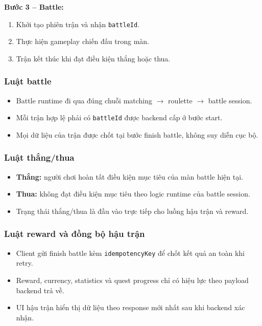 \textbf{Bước 3 -- Battle:}
\begin{enumerate}
    \item Khởi tạo phiên trận và nhận \texttt{battleId}.
    \item Thực hiện gameplay chiến đấu trong màn.
    \item Trận kết thúc khi đạt điều kiện thắng hoặc thua.
\end{enumerate}

\subsubsection{Luật battle}
\label{subsubsec:analysis_gameplay_battle_rules}
\begin{itemize}
    \item Battle runtime đi qua đúng chuỗi matching $\rightarrow$ roulette $\rightarrow$ battle session.
    \item Mỗi trận hợp lệ phải có \texttt{battleId} được backend cấp ở bước start.
    \item Mọi dữ liệu của trận được chốt tại bước finish battle, không suy diễn cục bộ.
\end{itemize}

\subsubsection{Luật thắng/thua}
\label{subsubsec:analysis_gameplay_winlose_rules}
\begin{itemize}
    \item \textbf{Thắng:} người chơi hoàn tất điều kiện mục tiêu của màn battle hiện tại.
    \item \textbf{Thua:} không đạt điều kiện mục tiêu theo logic runtime của battle session.
    \item Trạng thái thắng/\allowbreak thua là đầu vào trực tiếp cho luồng hậu trận và reward.
\end{itemize}

\subsubsection{Luật reward và đồng bộ hậu trận}
\label{subsubsec:analysis_gameplay_reward_rules}
\begin{itemize}
    \item Client gửi finish battle kèm \texttt{idempotencyKey} để chốt kết quả an toàn khi retry.
    \item Reward, currency, statistics và quest progress chỉ có hiệu lực theo payload backend trả về.
    \item UI hậu trận hiển thị dữ liệu theo response mới nhất sau khi backend xác nhận.
\end{itemize}

